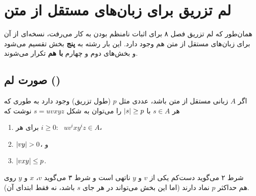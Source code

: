 \chapter{لم تزریق برای زبان‌های مستقل از متن}

همان‌طور که لم تزریق فصل ۸ برای اثبات نامنظم بودن به کار می‌رفت، نسخه‌ای از آن برای زبان‌های مستقل از متن هم وجود دارد. این بار رشته به \textbf{پنج} بخش تقسیم می‌شود و بخش‌های دوم و چهارم \textbf{با هم} تکرار می‌شوند.

\section{صورت لم ()}

\begin{theorem}\label{thm:cfl-pumping}
اگر $A$ زبانی مستقل از متن باشد، عددی مثل $p$ (طول تزریق) وجود دارد به طوری که هر $s\in A$ با $\lvert s\rvert\ge p$ را می‌توان به شکل $s=uvxyz$ نوشت که
\begin{enumerate}
\item برای هر $i\ge0$: \ $uv^ixy^iz\in A$،
\item $\lvert vy\rvert>0$، و
\item $\lvert vxy\rvert\le p$.
\end{enumerate}
\end{theorem}

شرط ۲ می‌گوید دست‌کم یکی از $v$ و $y$ ناتهی است و شرط ۳ می‌گوید $v$، $x$ و $y$ روی هم حداکثر $p$ نماد دارند (اما این بخش می‌تواند در هر جای $s$ باشد، نه فقط ابتدای آن).

